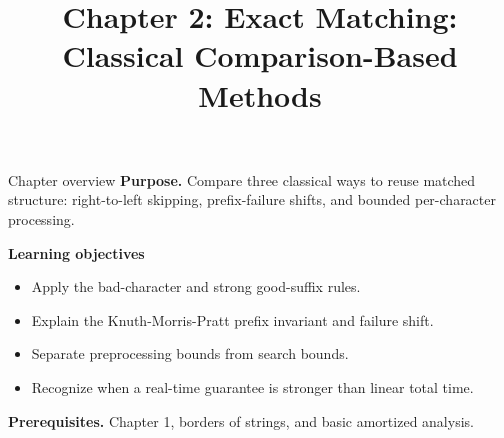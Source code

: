 \documentclass[11pt,letterpaper]{article}
\title{Chapter 2: Exact Matching: Classical Comparison-Based Methods}
\author{}
\date{}
\begin{document}
\maketitle

\begin{CornellOverviewBox}{Chapter overview}
\textbf{Purpose.} Compare three classical ways to reuse matched structure: right-to-left skipping, prefix-failure shifts, and bounded per-character processing.

\textbf{Learning objectives}
\begin{itemize}
  \item Apply the bad-character and strong good-suffix rules.
  \item Explain the Knuth-Morris-Pratt prefix invariant and failure shift.
  \item Separate preprocessing bounds from search bounds.
  \item Recognize when a real-time guarantee is stronger than linear total time.
\end{itemize}

\textbf{Prerequisites.} Chapter 1, borders of strings, and basic amortized analysis.
\end{CornellOverviewBox}
\end{document}
